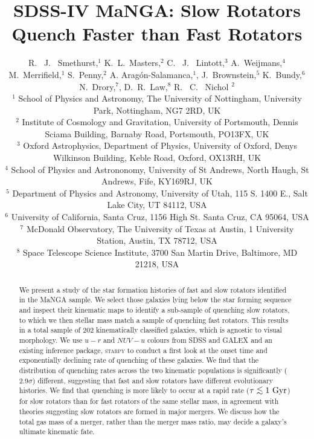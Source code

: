 \documentclass[useAMS,usenatbib]{mn2e}
\def\lesssim{\mathrel{\hbox{\rlap{\hbox{\lower3pt\hbox{$\sim$}}}\hbox{\raise2pt\hbox{$<$}}}}}
\begin{document}
\title[Quenching Histories of Fast and Slow Rotators]{SDSS-IV MaNGA: Slow Rotators Quench Faster than Fast Rotators}
\author[Smethurst et al. 2017]{R. ~J. ~Smethurst,$^{1}$ K.~L.~Masters,$^{2}$  C. ~J. ~Lintott,$^{3}$ A.~Weijmans,$^{4}$  M.~Merrifield,$^{1}$ \newauthor S.~Penny,$^{2}$ A. Arag\'on-Salamanca,$^{1}$,  J.~Brownstein,$^{5}$ K.~Bundy,$^{6}$  N.~Drory,$^{7}$, \newauthor  D.~R.~Law,$^{8}$ R. ~C. ~Nichol $^{2}$ 
\\ $^1$ School of Physics and Astronomy, The University of Nottingham, University Park, Nottingham, NG7 2RD, UK
\\ $^2$ Institute of Cosmology and Gravitation, University of Portsmouth, Dennis Sciama Building, Barnaby Road, Portsmouth, PO13FX, UK 
\\ $^3$ Oxford Astrophysics, Department of Physics, University of Oxford, Denys Wilkinson Building, Keble Road, Oxford, OX13RH, UK
\\ $^4$ School of Physics and Astrononomy, University of St Andrews, North Haugh, St Andrews, Fife, KY169RJ, UK
\\ $^5$ Department of Physics and Astronomy, University of Utah, 115 S. 1400 E., Salt Lake City, UT 84112, USA
\\ $^6$ 	University of California, Santa Cruz, 1156 High St. Santa Cruz, CA 95064, USA
\\ $^7$ McDonald Observatory, The University of Texas at Austin, 1 University Station, Austin, TX 78712, USA
\\ $^8$ Space Telescope Science Institute, 3700 San Martin Drive, Baltimore, MD 21218, USA
}

\maketitle

\begin{abstract}
We present a study of the star formation histories of fast and slow rotators identified in the MaNGA sample. We select those galaxies lying below the star forming sequence and inspect their kinematic maps to identify a sub-sample of quenching slow rotators, to which we then stellar mass match a sample of quenching fast rotators. This results in a total sample of $202$ kinematically classified galaxies, which is agnostic to visual morphology. We use $u-r$ and $NUV-u$ colours from SDSS and GALEX and an existing inference package, \textsc{starpy} to conduct a first look at the onset time and exponentially declining rate of quenching of these galaxies. We find that the distribution of quenching rates across the two kinematic populations is significantly ($2.9\sigma$) different, suggesting that fast and slow rotators have different evolutionary histories. We find that quenching is more likely to occur at a rapid rate ($\tau \lesssim 1~\rm{Gyr}$) for slow rotators than for fast rotators of the same stellar mass, in agreement with theories suggesting slow rotators are formed in major mergers. We discuss how the total gas mass of a merger, rather than the merger mass ratio, may decide a galaxy's ultimate kinematic fate. 
\end{abstract}
\end{document}
